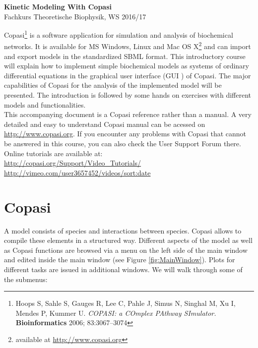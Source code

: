 \documentclass[a4paper,11pt,twoside]{article}
\begin{document}
\thispagestyle{empty}
 \begin{center}
 \textbf{ \Huge Kinetic Modeling With Copasi}\\\vspace{0.2cm}
Fachkurs Theoretische Biophysik, WS 2016/17
 \end{center}

\vspace{3cm}

Copasi\footnote{Hoops S, Sahle S, Gauges R, Lee C, Pahle J, Simus N,
 Singhal M, Xu I, Mendes P, Kummer U. \textit{COPASI: a COmplex
  PAthway SImulator.} \textbf{Bioinformatics} 2006; 83:3067--3074}
is a software application for simulation and analysis of biochemical
networks. It is available for MS Windows, Linux and Mac OS X\footnote{available  at \url{http://www.copasi.org}}  and can
import and export models in the standardized SBML format. This introductory course will explain how to implement simple biochemical models as systems of ordinary differential equations in the graphical user interface (GUI ) of Copasi. The major capabilities of Copasi for the analysis of the implemented model will be presented. The introduction is followed by some hands on exercises with different models and functionalities.
\vspace{1cm}\\
This accompanying document is a Copasi reference rather than a manual. A very detailed and
easy  to  understand  Copasi  manual can  be  acessed on 
\url{http://www.copasi.org}. If you encounter any problems with Copasi that cannot
be answered in this course, you can also check the User Support Forum
there. Online tutorials are available at:\\
\url{http://copasi.org/Support/Video_Tutorials/}\\
\url{http://vimeo.com/user3657452/videos/sort:date}

\newpage
\tableofcontents


\newpage
\section{Copasi}
A model consists of species and interactions between species. Copasi allows to compile these elements in a structured way. Different aspects of the model as well as Copasi functions are browsed via a menu on the left side of the main window and edited inside the main window (see Figure \ref{fig:MainWindow}). Plots for different tasks are issued in additional windows. We will walk through some of the submenus:
\end{document}
